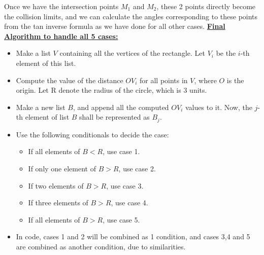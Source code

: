 \documentclass[12pt]{article}
\begin{document}
Once we have the intersection points $M_1$ and $M_2$, these 2 points directly become the collision limits, and we can calculate the angles corresponding to these points from the tan inverse formula as we have done for all other cases.
\newline
\newline
\underline{\textbf{Final Algorithm to handle all 5 cases:}}
\newline
\begin{itemize}
    \item Make a list $V$ containing all the vertices of the rectangle. Let $V_i$ be the $i$-th element of this list.
    
    \item Compute the value of the distance $OV_i$ for all points in $V$, where $O$ is the origin. Let R denote the radius of the circle, which is 3 units.
    
    \item Make a new list $B$, and append all the computed $OV_i$ values to it. Now, the $j$-th element of list $B$ shall be represented as $B_j$.
    
    \item Use the following conditionals to decide the case:
    \begin{itemize}
        \renewcommand\labelitemi{--}
        \item If all elements of $B < R$, use case 1.
        \item If only one element of $B > R$, use case 2.
        \item If two elements of $B > R$, use case 3.
        \item If three elements of $B > R$, use case 4.
        \item If all elements of $B > R$, use case 5.
    \end{itemize}
    
    \item In code, cases 1 and 2 will be combined as 1 condition, and cases 3,4 and 5 are combined as another condition, due to similarities.
\end{itemize}
\end{document}
